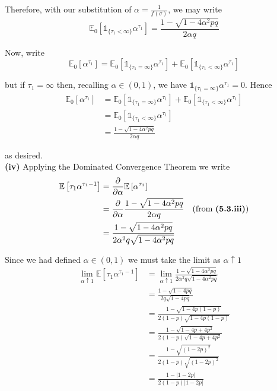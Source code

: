 \documentclass[12pt]{article}
\newcommand{\E}{\mathbb E}
\begin{document}
Therefore, with our substitution of $\alpha = \frac{1}{f(\sigma)}$, we may write
\begin{equation*}
	\E_0 \left[ \mathds 1_{\{ \tau_1 < \infty \}} \alpha^{\tau_1} \right] = \frac{1 - \sqrt{1 - 4\alpha^2pq} }{ 2\alpha q }
\end{equation*}

Now, write
\begin{equation*}
	\E_0\left[ \alpha^{\tau_1} \right] = \E_0 \left[ \mathds 1_{\{ \tau_1 = \infty \}} \alpha^{\tau_1} \right] + \E_0 \left[ \mathds 1_{\{ \tau_1 < \infty \}} \alpha^{\tau_1} \right]
\end{equation*}

but if $\tau_1 = \infty$ then, recalling $\alpha \in (0,1)$, we have $\mathds 1_{\{ \tau_1 = \infty \}} \alpha^{\tau_1} = 0$. Hence
\begin{align*}
	\E_0\left[ \alpha^{\tau_1} \right] &= \E_0 \left[ \mathds 1_{\{ \tau_1 = \infty \}} \alpha^{\tau_1} \right] + \E_0 \left[ \mathds 1_{\{ \tau_1 < \infty \}} \alpha^{\tau_1} \right] \\
	&= \E_0 \left[ \mathds 1_{\{ \tau_1 < \infty \}} \alpha^{\tau_1} \right] \\
	&= \frac{1 - \sqrt{1 - 4\alpha^2pq} }{ 2\alpha q }
\end{align*}

as desired. \\

{\bf (iv)} Applying the Dominated Convergence Theorem we write
\begin{align*}
	\E \left[ \tau_1 \alpha^{\tau_1 - 1} \right] &= \frac{ \partial }{ \partial \alpha } \E \left[ \alpha^{\tau_1} \right] \\
	&= \frac{ \partial }{ \partial \alpha }  \frac{ 1 - \sqrt{1 - 4\alpha^2 pq } }{ 2\alpha q }  \quad \text{(from {\bf (5.3.iii)})} \\
	&= \frac{ 1 - \sqrt{1 - 4\alpha^2 pq} }{ 2\alpha^2 q \sqrt{1 - 4\alpha^2 pq} }
\end{align*}

Since we had defined $\alpha \in (0,1)$ we must take the limit as $\alpha \uparrow 1$
\begin{align*}
	\lim_{\alpha \uparrow 1} \E \left[ \tau_1 \alpha^{\tau_1 - 1} \right] &= \lim_{\alpha \uparrow 1} \frac{ 1 - \sqrt{1 - 4\alpha^2 pq} }{ 2\alpha^2 q \sqrt{1 - 4\alpha^2 pq} } \\
	&= \frac{ 1 - \sqrt{1 - 4 pq} }{ 2 q \sqrt{1 - 4 pq} } \\
	&= \frac{ 1 - \sqrt{1 - 4 p ( 1 - p ) } }{ 2 (1 - p) \sqrt{1 - 4 p (1 - p)} } \\
	&= \frac{ 1 - \sqrt{ 1 - 4p + 4p^2 }}{ 2 (1 - p) \sqrt{ 1 - 4p + 4p^2 } } \\
	&= \frac{ 1 - \sqrt{(1 - 2p)^2} }{ 2(1 - p) \sqrt{ (1 - 2p)^2 } } \\
	&= \frac{1 - |1 - 2p| }{ 2(1 - p)|1 - 2p| }
\end{align*}
\end{document}
